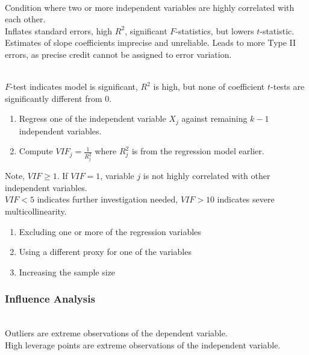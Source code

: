 \begin{remark} \\
Condition where two or more independent variables are highly correlated with each other.\\
Inflates standard errors, high $R^2$, significant $F$-statistics, but lowers $t$-statistic. Estimates of slope coefficients imprecise and unreliable. Leads to more Type II errors, as precise credit cannot be assigned to error variation.
\end{remark}

\begin{definition} \\
$F$-test indicates model is significant, $R^2$ is high, but none of coefficient $t$-tests are significantly different from $0$.
\begin{enumerate}[label=\roman*.]
\setlength{\itemsep}{0pt}
\item Regress one of the independent variable $X_j$ against remaining $k-1$ independent variables.
\item Compute $VIF_j = \frac{1}{R^2_j}$ where $R^2_j$ is from the regression model earlier.
\end{enumerate}
Note, $VIF \geq 1$. If $VIF = 1$, variable $j$ is not highly correlated with other independent variables.\\
$VIF < 5$ indicates further investigation needed, $VIF > 10$ indicates severe multicollinearity.
\end{definition}

\begin{remark} 
\begin{enumerate}[label=\roman*.]
\setlength{\itemsep}{0pt}
\item Excluding one or more of the regression variables
\item Using a different proxy for one of the variables
\item Increasing the sample size
\end{enumerate}
\end{remark}

\subsubsection{Influence Analysis}

\begin{definition} \\
Outliers are extreme observations of the dependent variable.\\
High leverage points are extreme observations of the independent variable.
\end{definition}

